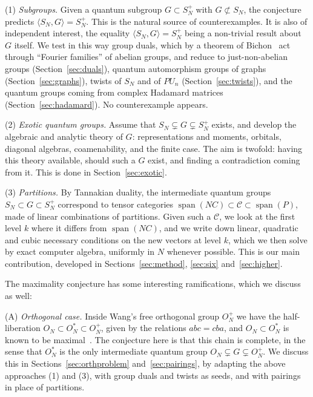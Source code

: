 \documentclass[11pt]{amsart}
\theoremstyle{definition}
\theoremstyle{remark}
\theoremstyle{plain}
\numberwithin{equation}{section}
\numberwithin{table}{section}
\DeclareMathOperator{\spn}{span}
\begin{document}
\smallskip
(1) \emph{Subgroups.} Given a quantum subgroup $G\subset S_N^+$ with $G\not\subset S_N$, the conjecture predicts $\langle S_N,G\rangle=S_N^+$. This is the natural source of counterexamples. It is also of independent interest, the equality $\langle S_N,G\rangle=S_N^+$ being a non-trivial result about $G$ itself. We test in this way group duals, which by a theorem of Bichon~\cite{bi} act through ``Fourier families'' of abelian groups, and reduce to just-non-abelian groups (Section~\ref{sec:duals}), quantum automorphism groups of graphs (Section~\ref{sec:graphs}), twists of $S_N$ and of $PU_n$ (Section~\ref{sec:twists}), and the quantum groups coming from complex Hadamard matrices (Section~\ref{sec:hadamard}). No counterexample appears.

\smallskip
(2) \emph{Exotic quantum groups.} Assume that $S_N\subsetneq G\subsetneq S_N^+$ exists, and develop the algebraic and analytic theory of $G$: representations and moments, orbitals, diagonal algebras, coamenability, and the finite case. The aim is twofold: having this theory available, should such a $G$ exist, and finding a contradiction coming from it. This is done in Section~\ref{sec:exotic}.

\smallskip
(3) \emph{Partitions.} By Tannakian duality, the intermediate quantum groups $S_N\subset G\subset S_N^+$ correspond to tensor categories $\spn(NC)\subset\mathcal C\subset\spn(P)$, made of linear combinations of partitions. Given such a $\mathcal C$, we look at the first level $k$ where it differs from $\spn(NC)$, and we write down linear, quadratic and cubic necessary conditions on the new vectors at level $k$, which we then solve by exact computer algebra, uniformly in $N$ whenever possible. This is our main contribution, developed in Sections~\ref{sec:method}, \ref{sec:six} and~\ref{sec:higher}.

\smallskip
The maximality conjecture has some interesting ramifications, which we discuss as well:

\smallskip
(A) \emph{Orthogonal case.} Inside Wang's free orthogonal group $O_N^+$ we have the half-liberation $O_N\subset O_N^*\subset O_N^+$, given by the relations $abc=cba$, and $O_N\subset O_N^*$ is known to be maximal~\cite{bbcc}. The conjecture here is that this chain is complete, in the sense that $O_N^*$ is the only intermediate quantum group $O_N\subsetneq G\subsetneq O_N^+$. We discuss this in Sections~\ref{sec:orthproblem} and~\ref{sec:pairings}, by adapting the above approaches (1) and (3), with group duals and twists as seeds, and with pairings in place of partitions.
\end{document}
